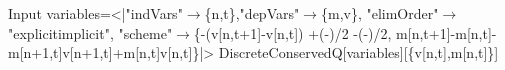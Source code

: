 \begin{mmaCell}[moredefined={variables, DiscreteConservedQ}]{Input}
  variables=<|"indVars"\(\pmb{\to}\)\{n,t\},"depVars"\(\pmb{\to}\)\{m,v\},
  "elimOrder"\(\pmb{\to}\)"explicitimplicit",
  "scheme"\(\pmb{\to}\)\{-(v[n,t+1]-v[n,t])
  +(-)/2
  -(-)/2,
  m[n,t+1]-m[n,t]-m[n+1,t]v[n+1,t]+m[n,t]v[n,t]\}|>
  DiscreteConservedQ[variables][\{v[n,t],m[n,t]\}]
  
\end{mmaCell}